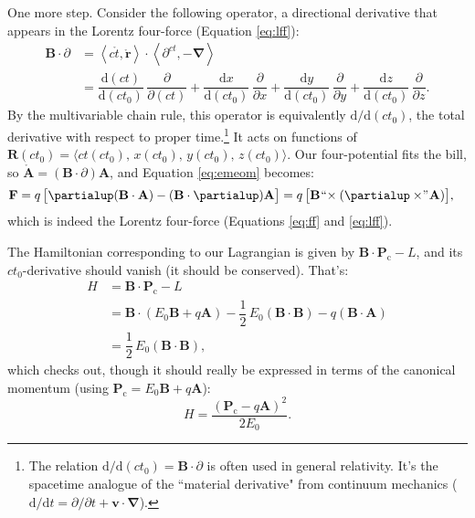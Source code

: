 \documentclass[12pt]{article}
\renewcommand{\vv}[1]{\mathbf{#1}}
\newcommand{\dd}[1]{\mathrm{d}#1}
\newcommand{\del}{\boldsymbol{\nabla}}
\begin{document}
One more step. Consider the following operator, a directional derivative that appears in the Lorentz four-force (Equation \ref{eq:lff}):
\begin{equation*}
\begin{split}
\vv B \cdot \partialup &= \left \langle c \mathring{t}, \mathring{\vv r} \right \rangle \cdot \left \langle \partial^{ct}, - \del \right \rangle \\[4pt]
&= \dfrac{\dd (ct)}{\dd (ct_0)} \, \dfrac{\partial}{\partial (ct)} + \dfrac{\dd x}{\dd (ct_0)} \, \dfrac{\partial}{\partial x} +  \dfrac{\dd y}{\dd (ct_0)} \, \dfrac{\partial}{\partial y} + \dfrac{\dd z}{\dd (ct_0)} \, \dfrac{\partial}{\partial z} .
\end{split}
\end{equation*}
By the multivariable chain rule, this operator is equivalently $\dd / \dd (ct_0)$, the total derivative with respect to proper time.\footnote{The relation $\dd / \dd (ct_0) = \vv B \cdot \partialup$ is often used in general relativity. It's the spacetime analogue of the ``material derivative" from continuum mechanics ($\dd / \dd t = \partial / \partial t + \vv v \cdot \del$).} It acts on functions of ${\vv R (ct_0) = \langle ct (ct_0), \, x (ct_0), \, y (ct_0), \, z (ct_0) \rangle}$. Our four-potential fits the bill, so $\mathring{\vv A} = (\vv B \cdot \partialup) \vv A $, and Equation \ref{eq:emeom} becomes:
\begin{equation*}
\begin{split}
\vv F &= q \, \bigl[ \partialup (\vv B \cdot \vv A) - (\vv B \cdot \partialup) \vv A \bigr] = q \, \bigl[ \vv B \mkern1mu `` \mkern-4mu \times (\partialup \times \mkern-4mu " \mkern1mu \vv A) \bigr] ,
\end{split}
\end{equation*}
which is indeed the Lorentz four-force (Equations \ref{eq:ff} and \ref{eq:lff}).

The Hamiltonian corresponding to our Lagrangian is given by $ \vv B \cdot \vv P _\mathrm{c} - L $, and its $ct_0$-derivative should vanish (it should be conserved). That's:
\begin{equation*}
\begin{split}
H &= \vv B \cdot \vv P_\mathrm{c} - L \\
&= \vv B \cdot \left( E_0 \vv B + q \vv A \right) - \dfrac{1}{2} \, E_0 (\vv B \cdot \vv B) - q (\vv B \cdot \vv A) \\
&= \dfrac{1}{2} \, E_0 (\vv B \cdot \vv B) ,
\end{split}
\end{equation*}
which checks out, though it should really be expressed in terms of the canonical momentum (using $\vv P_\mathrm{c} = E_0 \vv B + q \vv A $):
\begin{equation*}
H = \dfrac{\left( \vv P_\mathrm{c} - q \vv A \right) ^2}{2 E_0} .
\end{equation*}
\end{document}
